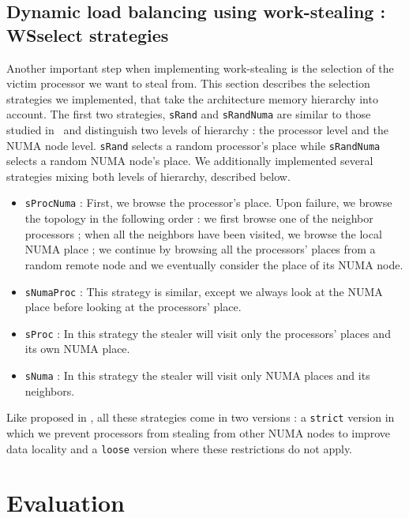 \documentclass[parallelisme]{compas2016}
\begin{document}
\subsection{Dynamic load balancing using work-stealing : WSselect strategies}

Another important step when implementing work-stealing is the selection of the victim processor we want to steal from.
This section describes the selection strategies we implemented, that take the architecture memory hierarchy into account.
The first two strategies, \verb!sRand! and \verb!sRandNuma! are similar to those studied in~\cite{DBLP:journals/ijhpca/OlivierPWSP12}
and distinguish two levels of hierarchy : the processor level and the NUMA node level.
\verb/sRand/ selects a random processor's place while \verb/sRandNuma/ selects a random NUMA node's place.
We additionally implemented several strategies mixing both levels of hierarchy,
described below.

\begin{itemize}
  \item \verb/sProcNuma/ : First, we browse the processor's place. Upon failure, we browse the topology in the following order : we first browse one of the neighbor processors ; when all the neighbors have been visited, we browse the local NUMA place ; we continue by browsing all the processors' places from a random remote node and we eventually consider the place of its NUMA node.
  \item \verb/sNumaProc/ : This strategy is similar, except we always look at the
    NUMA place before looking at the processors' place.
  \item \verb/sProc/ : In this strategy the stealer will visit only the
    processors' places and its own NUMA place.
  \item \verb/sNuma/ : In this strategy the stealer will visit only NUMA places
    and its neighbors. 
\end{itemize}

Like proposed in \cite{Olivier:2012:CMW:2388996.2389085}, all these strategies come in two versions : a \verb!strict! version in which we prevent processors from stealing from other NUMA nodes to improve data locality and a \verb!loose! version where these restrictions do not apply.


\section{Evaluation}
\label{sec:performances-evaluation}
\end{document}
